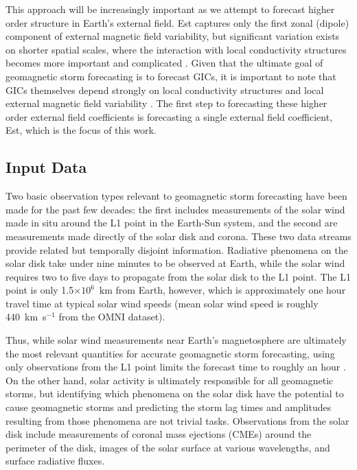 \documentclass[draft,linenumbers]{agujournal2018}
\begin{document}
This approach will be increasingly important as we attempt to forecast higher order structure in Earth's external field. Est captures only the first zonal (dipole) component of external magnetic field variability, but significant variation exists on shorter spatial scales, where the interaction with local conductivity structures becomes more important and complicated \citep{Kelbert2020}. Given that the ultimate goal of geomagnetic storm forecasting is to forecast GICs, it is important to note that GICs themselves depend strongly on local conductivity structures and local external magnetic field variability \citep{Olsen2004, Puethe2014}. The first step to forecasting these higher order external field coefficients is forecasting a single external field coefficient, Est, which is the focus of this work.


\subsection{Input Data}

Two basic observation types relevant to geomagnetic storm forecasting have been made for the past few decades: the first includes measurements of the solar wind made in situ around the L1 point in the Earth-Sun system, and the second are measurements made directly of the solar disk and corona. These two data streams provide related but temporally disjoint information. Radiative phenomena on the solar disk take under nine minutes to be observed at Earth, while the solar wind requires two to five days to propagate from the solar disk to the L1 point. The L1 point is only 1.5$\times 10^{6}$~km from Earth, however, which is approximately one hour travel time at typical solar wind speeds (mean solar wind speed is roughly 440~km~s$^{-1}$ from the OMNI dataset).

Thus, while solar wind measurements near Earth's magnetosphere are ultimately the most relevant quantities for accurate geomagnetic storm forecasting, using only observations from the L1 point limits the forecast time to roughly an hour \citep{Shprits2019}. On the other hand, solar activity is ultimately responsible for all geomagnetic storms, but identifying which phenomena on the solar disk have the potential to cause geomagnetic storms and predicting the storm lag times and amplitudes resulting from those phenomena are not trivial tasks. Observations from the solar disk include measurements of coronal mass ejections (CMEs) around the perimeter of the disk, images of the solar surface at various wavelengths, and surface radiative fluxes. 
\end{document}
